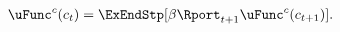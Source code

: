   \begin{equation}\begin{gathered}\begin{aligned}
        \uFunc^{c}(c_{t})  & = \ExEndStp[\DiscFac {\Rport}_{t+1} \uFunc^{c}(c_{t+1})]. \label{eq:EulercRiskyR}
      \end{aligned}\end{gathered}\end{equation}
